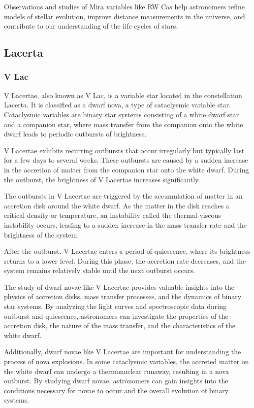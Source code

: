 Observations and studies of Mira variables like RW Cas help astronomers refine models of stellar evolution, improve distance measurements in the universe, and contribute to our understanding of the life cycles of stars.

\subsection{Lacerta}
\subsubsection*{ V Lac }

V Lacertae, also known as V Lac, is a variable star located in the constellation Lacerta. It is classified as a dwarf nova, a type of cataclysmic variable star. Cataclysmic variables are binary star systems consisting of a white dwarf star and a companion star, where mass transfer from the companion onto the white dwarf leads to periodic outbursts of brightness.

V Lacertae exhibits recurring outbursts that occur irregularly but typically last for a few days to several weeks. These outbursts are caused by a sudden increase in the accretion of matter from the companion star onto the white dwarf. During the outburst, the brightness of V Lacertae increases significantly.

The outbursts in V Lacertae are triggered by the accumulation of matter in an accretion disk around the white dwarf. As the matter in the disk reaches a critical density or temperature, an instability called the thermal-viscous instability occurs, leading to a sudden increase in the mass transfer rate and the brightness of the system.

After the outburst, V Lacertae enters a period of quiescence, where its brightness returns to a lower level. During this phase, the accretion rate decreases, and the system remains relatively stable until the next outburst occurs.

The study of dwarf novae like V Lacertae provides valuable insights into the physics of accretion disks, mass transfer processes, and the dynamics of binary star systems. By analyzing the light curves and spectroscopic data during outburst and quiescence, astronomers can investigate the properties of the accretion disk, the nature of the mass transfer, and the characteristics of the white dwarf.

Additionally, dwarf novae like V Lacertae are important for understanding the process of nova explosions. In some cataclysmic variables, the accreted matter on the white dwarf can undergo a thermonuclear runaway, resulting in a nova outburst. By studying dwarf novae, astronomers can gain insights into the conditions necessary for novae to occur and the overall evolution of binary systems.

